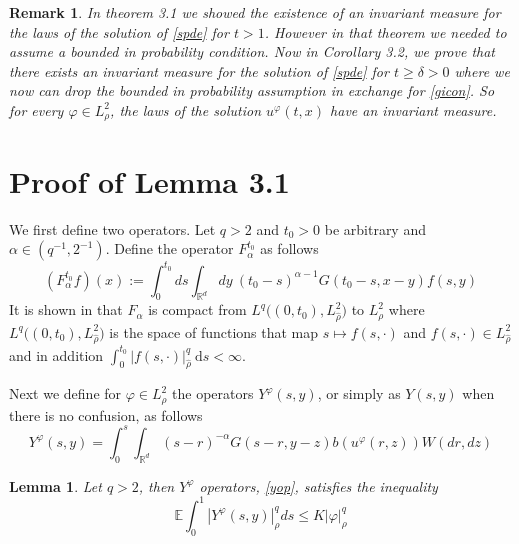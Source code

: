 \documentclass{article}
\newtheorem{remark}{Remark}[section]
\newtheorem{lemma}{Lemma}[section]
\numberwithin{equation}{section}
\newcommand{\R}{\mathbb{R}}
\newcommand{\E}{\mathbb{E}}
\newcommand{\ud}{\ensuremath{\mathrm{d}}}
\begin{document}
\begin{remark} \textit{In theorem 3.1 we showed the existence of an invariant measure for the laws of the solution of \eqref{spde} for $t>1$. However in that theorem we needed to assume a bounded in probability condition. Now in Corollary 3.2, we prove that there exists an invariant measure for the solution of \eqref{spde} for $t\ge \delta >0$ where we now can drop the bounded in probability assumption in exchange for \ref{gicon}. So for every $\varphi \in L^2_\rho$, the laws of the solution $u^\varphi(t,x)$ have an invariant measure.}
\end{remark}

\section{Proof of Lemma 3.1}
We first define two operators. Let $q>2$ and $t_0>0$ be arbitrary and $\alpha \in (q^{-1},2^{-1})$. Define the operator $F_\alpha^{t_0}$ as follows
\begin{equation}
\left(F_{\alpha}^{t_0} f\right)(x) := \int_0^{t_0} ds \int_{\R^d} dy \: (t_0-s)^{\alpha-1}G(t_0-s,x-y)f(s,y) \label{fop}
\end{equation}
It is shown in \cite{TessitoreZabczyk98M} that $F_\alpha$ is compact from $L^q\big((0,t_0),L^2_{\hat\rho} \big)$ to $L^2_\rho$ where $L^q\big((0,t_0),L^2_{\hat\rho} \big)$ is the space of functions that map $s \mapsto f(s,\cdot)$ and $f(s,\cdot) \in L^2_{\hat\rho}$ and in addition $\int_0^{t_0} |f(s,\cdot)|_{\hat\rho}^q \: \ud s < \infty$. 

Next we define for $\varphi \in L^2_{\rho}$ the operators $Y^\varphi(s,y)$, or simply as $Y(s,y)$ when there is no confusion, as follows 
\begin{equation}
Y^\varphi(s,y) =\int_0^s \int_{\R^d} (s-r)^{-\alpha}G(s-r,y-z)b(u^\varphi(r,z))W(dr,dz) \label{yop}
\end{equation} 

\begin{lemma} \textit{Let $q>2$, then $Y^\varphi$ operators, \eqref{yop}, satisfies the inequality} 
\begin{equation}
\E\int_0^1 |Y^\varphi(s,y)|_{\rho}^q ds \le K|\varphi|_\rho^q \label{yineq} 
\end{equation} 
\end{lemma}
\end{document}
